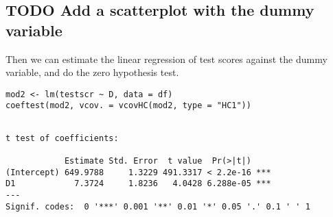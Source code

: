 \documentclass[11pt]{article}
\begin{document}
\subsection{{\bfseries\sffamily TODO} Add a scatterplot with the dummy variable}
\label{sec:org35b70ce}

Then we can estimate the linear regression of test scores against the
dummy variable, and do the zero hypothesis test.

\begin{verbatim}
mod2 <- lm(testscr ~ D, data = df)
coeftest(mod2, vcov. = vcovHC(mod2, type = "HC1"))
\end{verbatim}

\begin{verbatim}

t test of coefficients:

            Estimate Std. Error  t value  Pr(>|t|)
(Intercept) 649.9788     1.3229 491.3317 < 2.2e-16 ***
D1            7.3724     1.8236   4.0428 6.288e-05 ***
---
Signif. codes:  0 '***' 0.001 '**' 0.01 '*' 0.05 '.' 0.1 ' ' 1
\end{verbatim}
\end{document}
